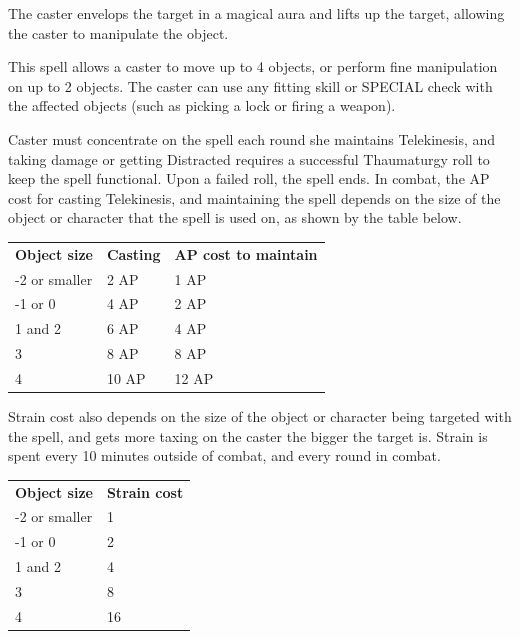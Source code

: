 \documentclass[11pt,a4paper,twocolumn]{book}
\begin{document}
	\medskip
	
	The caster envelops the target in a magical aura and lifts up the target, allowing the caster to manipulate the object.
	
	This spell allows a caster to move up to 4 objects, or perform fine manipulation on up to 2 objects. The caster can use any fitting skill or SPECIAL check with the affected objects (such as picking a lock or firing a weapon).
	
	Caster must concentrate on the spell each round she maintains Telekinesis, and taking damage or getting Distracted requires a successful Thaumaturgy roll to keep the spell functional. Upon a failed roll, the spell ends.
	In combat, the AP cost for casting Telekinesis, and maintaining the spell depends on the size of the object or character that the spell is used on, as shown by the table below.
	
	\medskip
	{
		\begin{tabu} to 75mm{| X[l,7] | X[l,5] | X[l,7] |}
			\hline
			\textbf{Object size} 			&\textbf{ Casting} 			& \textbf{AP cost to maintain} 	\\
			-2 or smaller					& 2 AP						& 1 AP 							\\
			-1 or 0     						& 4 AP						& 2 AP							\\ 
			1 and 2 							& 6 AP						& 4 AP							\\
			3								& 8 AP						& 8 AP							\\
			4								& 10 AP						& 12 AP							\\ \hline
		\end{tabu}
		
	}
	\medskip
	
	Strain cost also depends on the size of the object or character being targeted with the spell, and gets more taxing on the caster the bigger the target is. Strain is spent every 10 minutes outside of combat, and every round in combat.
	
	\medskip
	{
		\begin{tabu} to 75mm{| X[l,7] | X[l,7] |}
			\hline
			\textbf{Object size} 			&\textbf{ Strain cost} 			\\
			-2 or smaller					& 1								\\
			-1 or 0     						& 2								\\ 
			1 and 2 							& 4								\\
			3								& 8								\\
			4								& 16							\\ \hline
		\end{tabu}
		
	}
	\medskip
	
\end{document}
